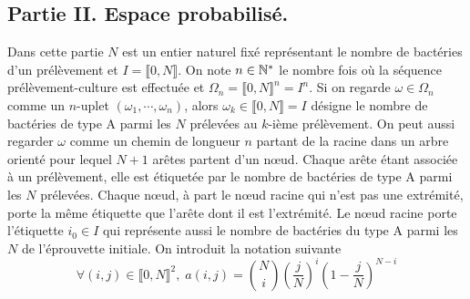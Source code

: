 \subsection*{Partie II. Espace probabilisé.}
Dans cette partie $N$ est un entier naturel fixé représentant le nombre de bactéries d'un prélèvement et $I=\llbracket 0,N \rrbracket$. On note $n\in \mathbb{N}^*$ le nombre fois où la séquence prélèvement-culture est effectuée et $\Omega_n = \llbracket 0,N \rrbracket ^n = I^n$.\newline
Si on regarde $\omega \in \Omega_n$ comme un $n$-uplet $(\omega_1,\cdots, \omega_n)$, alors $\omega_k \in \llbracket 0,N \rrbracket = I$ désigne le nombre de bactéries de type A  parmi les $N$ prélevées au $k$-ième prélèvement. \newline
On peut aussi regarder $\omega$ comme un chemin de longueur $n$ partant de la racine dans un arbre orienté pour lequel $N+1$ arêtes partent d'un n\oe{}ud. Chaque arête étant associée à un prélèvement, elle est étiquetée par le nombre de bactéries de type A  parmi les $N$ prélevées. Chaque n\oe{}ud, à part le n\oe{}ud racine qui n'est pas une extrémité, porte la même étiquette que l'arête dont il est l'extrémité.\newline
Le n\oe{}ud racine porte l'étiquette $i_0\in I$ qui représente aussi le nombre de bactéries du type A parmi les $N$ de l'éprouvette initiale.\newline
On introduit la notation suivante 
\begin{displaymath}
\forall (i,j)\in \llbracket 0, N \rrbracket^2, \; a(i,j) = \binom{N}{i}\left( \frac{j}{N}\right) ^i\left( 1-\frac{j}{N}\right) ^{N-i}  
\end{displaymath}

